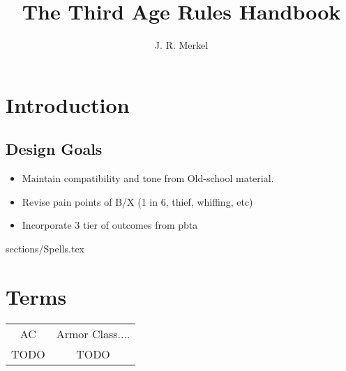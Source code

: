 \documentclass[18pt]{article}
\title{\fontsize{70}{80} \selectfont The Third Age Rules Handbook}
\author{J. R. Merkel}
\date{}
\begin{document}
\sffamily
\large
\frenchspacing
\singlespacing
\parskip=0pt
\parindent=0pt
\lstset{aboveskip=0pt, belowskip=0pt}


\maketitle
\thispagestyle{empty}
\pagebreak
\thispagestyle{empty}
\tableofcontents
\pagebreak
\section*{Introduction}

\subsection*{Design Goals}
\begin{itemize}
	\item Maintain compatibility and tone from Old-school material.
        \item Revise pain points of B/X (1 in 6, thief, whiffing, etc)
        \item Incorporate 3 tier of outcomes from pbta
\end{itemize}















 {sections/Spells.tex}







\appendix
\section*{Terms}
\begin{tabular}{c c}

AC & Armor Class.... \\

TODO & TODO \\

\end{tabular}
\end{document}
